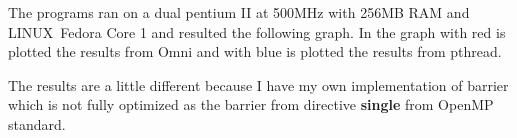 \documentclass[a4paper]{article}
\begin{document}
The programs ran on a dual pentium II at 500MHz with 256MB RAM and LINUX\
Fedora Core 1 and resulted the following graph. In the graph with red is
plotted the results from Omni and with blue is plotted the results from
pthread.

The results are a little different because I have my own implementation of
barrier which is not fully optimized as the barrier from directive \textbf{%
single} from OpenMP standard.

\begin{center}
\end{center}
\end{document}
